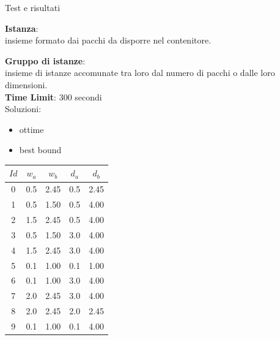 \documentclass{beamer}
\begin{document}
\begin{frame}{Test e risultati}
	\begin{minipage}[c]{0.45\textwidth}
		\textbf{Istanza}:\\ insieme formato dai pacchi da disporre nel contenitore.
		\vspace{.5cm}
						
		\textbf{Gruppo di istanze}:\\ insieme di istanze accomunate tra loro dal numero di pacchi o dalle loro dimensioni.\\
						
		\textbf{Time Limit}: 300 secondi\\
						
		Soluzioni:
		\begin{itemize}
			\item ottime
			\item best bound
		\end{itemize}
	\end{minipage}
	\hfill
	\begin{minipage}[c]{0.45\textwidth}
		\begin{center}
			\begin{tabular}{c|c|c|c|c}
				$Id$ & $w_a$ & $w_b$ & $d_a$ & $d_b$ \\
				\hline	
				0  & 0.5   & 2.45  & 0.5   & 2.45  \\
				1  & 0.5   & 1.50  & 0.5   & 4.00  \\
				2  & 1.5   & 2.45  & 0.5   & 4.00  \\
				3  & 0.5   & 1.50  & 3.0   & 4.00  \\
				4  & 1.5   & 2.45  & 3.0   & 4.00  \\
				5  & 0.1   & 1.00  & 0.1   & 1.00  \\
				6  & 0.1   & 1.00  & 3.0   & 4.00  \\
				7  & 2.0   & 2.45  & 3.0   & 4.00  \\
				8  & 2.0   & 2.45  & 2.0   & 2.45  \\
				9  & 0.1   & 1.00  & 0.1   & 4.00  \\
			\end{tabular}
		\end{center}
	\end{minipage}
\end{frame}
\end{document}
